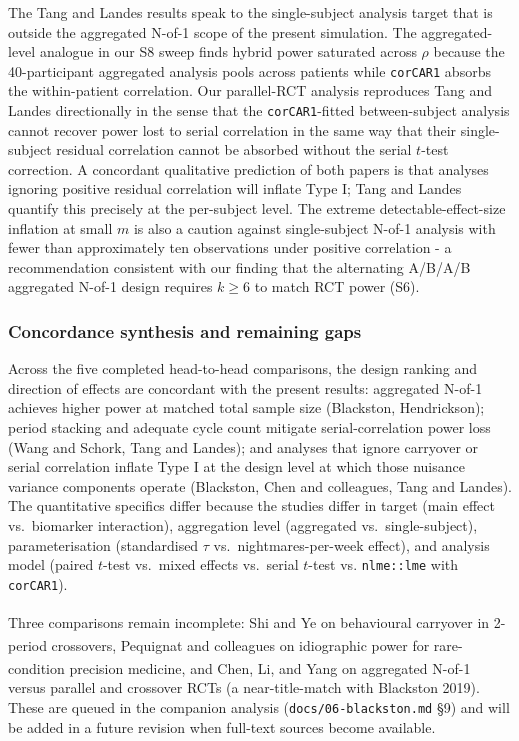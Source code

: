 \documentclass[
  11pt,
]{article}
\begin{document}
The Tang and Landes results speak to the single-subject analysis target
that is outside the aggregated N-of-1 scope of the present simulation.
The aggregated-level analogue in our S8 sweep finds hybrid power
saturated across \(\rho\) because the 40-participant aggregated analysis
pools across patients while \texttt{corCAR1} absorbs the within-patient
correlation. Our parallel-RCT analysis reproduces Tang and Landes
directionally in the sense that the \texttt{corCAR1}-fitted
between-subject analysis cannot recover power lost to serial correlation
in the same way that their single-subject residual correlation cannot be
absorbed without the serial \(t\)-test correction. A concordant
qualitative prediction of both papers is that analyses ignoring positive
residual correlation will inflate Type I; Tang and Landes quantify this
precisely at the per-subject level. The extreme detectable-effect-size
inflation at small \(m\) is also a caution against single-subject N-of-1
analysis with fewer than approximately ten observations under positive
correlation - a recommendation consistent with our finding that the
alternating A/B/A/B aggregated N-of-1 design requires \(k \ge 6\) to
match RCT power (S6).

\subsubsection{Concordance synthesis and remaining
gaps}\label{concordance-synthesis-and-remaining-gaps}

Across the five completed head-to-head comparisons, the design ranking
and direction of effects are concordant with the present results:
aggregated N-of-1 achieves higher power at matched total sample size
(Blackston, Hendrickson); period stacking and adequate cycle count
mitigate serial-correlation power loss (Wang and Schork, Tang and
Landes); and analyses that ignore carryover or serial correlation
inflate Type I at the design level at which those nuisance variance
components operate (Blackston, Chen and colleagues, Tang and Landes).
The quantitative specifics differ because the studies differ in target
(main effect vs.~biomarker interaction), aggregation level (aggregated
vs.~single-subject), parameterisation (standardised \(\tau\)
vs.~nightmares-per-week effect), and analysis model (paired \(t\)-test
vs.~mixed effects vs.~serial \(t\)-test vs. \texttt{nlme::lme} with
\texttt{corCAR1}).

Three comparisons remain incomplete: Shi and
Ye\textsuperscript{}
on behavioural carryover in 2-period crossovers, Pequignat and
colleagues\textsuperscript{}
on idiographic power for rare-condition precision medicine, and Chen,
Li, and
Yang\textsuperscript{}
on aggregated N-of-1 versus parallel and crossover RCTs (a
near-title-match with Blackston 2019). These are queued in the companion
analysis (\texttt{docs/06-blackston.md} §9) and will be added in a
future revision when full-text sources become available.
\end{document}
